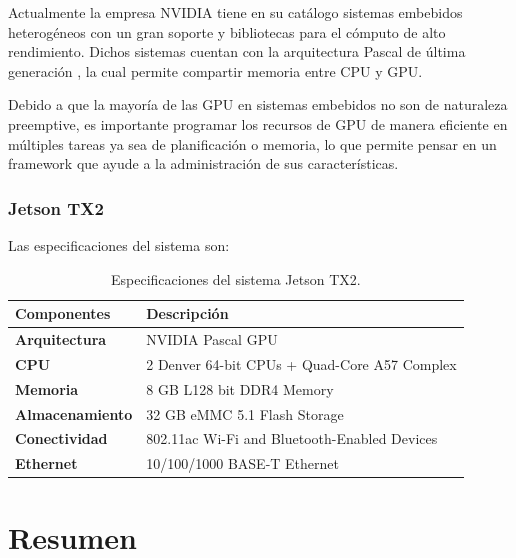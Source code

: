     Actualmente la empresa NVIDIA tiene en su catálogo sistemas embebidos heterogéneos con un gran soporte y bibliotecas para el cómputo de alto rendimiento. Dichos sistemas cuentan con la arquitectura Pascal de última generación \cite{GPUArt}, la cual permite compartir memoria entre CPU y GPU.

   
    Debido a que la mayoría de las GPU en sistemas embebidos no son de naturaleza preemptive, es importante programar los recursos de GPU de manera eficiente en múltiples tareas \cite{TX2I} ya sea de planificación o memoria, lo que permite pensar en un framework que ayude a la administración de sus características. 

 \subsubsection{Jetson TX2}
    Las especificaciones del sistema son:

    \begin{table}[h!]
      \begin{center}
            \scriptsize
        \begin{tabular}{|m{3.5cm}|m{6.5cm}|}
         \hline
        \cellcolor{lightgray}\textbf{Componentes} & \cellcolor{lightgray} \textbf{Descripción}\\ 
         \hline
         \textbf{Arquitectura} & NVIDIA Pascal GPU\\
         \hline
         \textbf{CPU} & 2 Denver 64-bit CPUs + Quad-Core A57 Complex\\
         \hline
         \textbf{Memoria} & 8 GB L128 bit DDR4 Memory\\
          \hline
    	\textbf{Almacenamiento} & 32 GB eMMC 5.1 Flash Storage\\
         \hline
    	\textbf{Conectividad} & 802.11ac Wi-Fi and Bluetooth-Enabled Devices\\
         \hline
   	 \textbf{Ethernet} &10/100/1000 BASE-T Ethernet\\
         \hline
        \end{tabular}
        \caption{Especificaciones del sistema Jetson TX2\cite{jtx2dk}.}
        \label{tab:table1}
      \end{center}
    \end{table}
   
    \section{Resumen}

